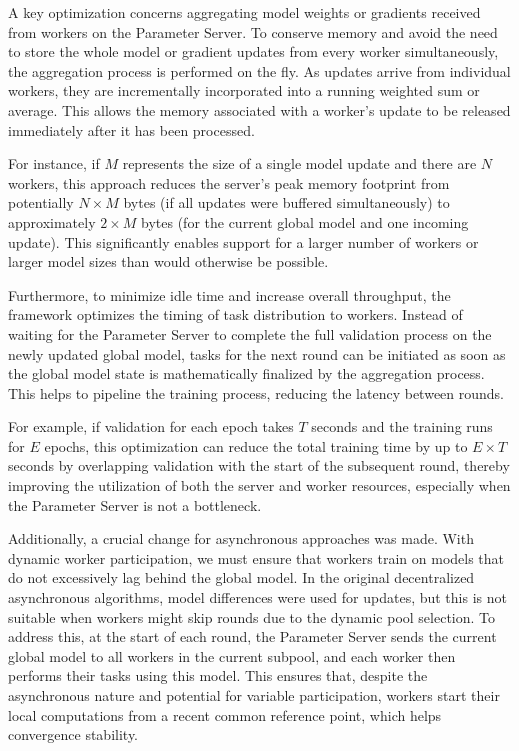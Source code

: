 A key optimization concerns aggregating model weights or gradients received from workers on the Parameter Server. To conserve memory and avoid the need to store the whole model or gradient updates from every worker simultaneously, the aggregation process is performed on the fly. As updates arrive from individual workers, they are incrementally incorporated into a running weighted sum or average. This allows the memory associated with a worker's update to be released immediately after it has been processed. 

For instance, if $M$ represents the size of a single model update and there are $N$ workers, this approach reduces the server's peak memory footprint from potentially $N \times M$ bytes (if all updates were buffered simultaneously) to approximately $2 \times M$ bytes (for the current global model and one incoming update). This significantly enables support for a larger number of workers or larger model sizes than would otherwise be possible.

Furthermore, to minimize idle time and increase overall throughput, the framework optimizes the timing of task distribution to workers. Instead of waiting for the Parameter Server to complete the full validation process on the newly updated global model, tasks for the next round can be initiated as soon as the global model state is mathematically finalized by the aggregation process. This helps to pipeline the training process, reducing the latency between rounds. 

For example, if validation for each epoch takes $T$ seconds and the training runs for $E$ epochs, this optimization can reduce the total training time by up to $E \times T$ seconds by overlapping validation with the start of the subsequent round, thereby improving the utilization of both the server and worker resources, especially when the Parameter Server is not a bottleneck.

Additionally, a crucial change for asynchronous approaches was made. With dynamic worker participation, we must ensure that workers train on models that do not excessively lag behind the global model. In the original decentralized asynchronous algorithms, model differences were used for updates, but this is not suitable when workers might skip rounds due to the dynamic pool selection. To address this, at the start of each round, the Parameter Server sends the current global model to all workers in the current subpool, and each worker then performs their tasks using this model. This ensures that, despite the asynchronous nature and potential for variable participation, workers start their local computations from a recent common reference point, which helps convergence stability.



